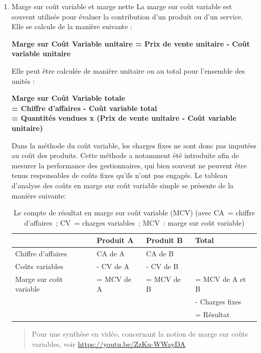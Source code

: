 \documentclass{tufte-handout}
\begin{document}
\begin{enumerate}
\item Marge sur coût variable et marge nette
\label{sec:org3563c23}
La marge sur coût variable est souvent utilisée pour évaluer la contribution d'un produit ou d'un service. Elle se calcule de la manière suivante :\\
\begin{center}
\textbf{Marge sur Coût Variable unitaire = Prix de vente unitaire - Coût variable unitaire}\\
\end{center}
Elle peut être calculée de manière unitaire ou au total pour l'ensemble des unités :\\
\begin{center}
\textbf{Marge sur Coût Variable totale}\\
\textbf{= Chiffre d'affaires - Coût variable total}\\
\textbf{= Quantités vendues x (Prix de vente unitaire - Coût variable unitaire)}\\
\end{center}
Dans la méthode du coût variable, les charges fixes ne sont donc pas imputées au coût des produits. Cette méthode a notamment été introduite afin de mesurer la performance des gestionnaires, qui bien souvent ne peuvent être tenus responsables de coûts fixes qu'ils n'ont pas engagés. Le tableau d'analyse des coûts en marge sur coût variable simple se présente de la manière suivante:\\
\begin{table}[htbp]
\caption{Le compte de résultat en marge sur coût variable (MCV) (avec CA = chiffre d'affaires ; CV = charges variables ; MCV : marge sur coût variable)}
\centering
\begin{tabular}{llll}
 & Produit A & Produit B & Total\\
\hline
Chiffre d'affaires & CA de A & CA de B & \\
Coûts variables & - CV de A & - CV de B & \\
Marge sur coût variable & = MCV de A & = MCV de B & = MCV de A et B\\
 &  &  & - Charges fixes\\
 &  &  & = Résultat\\
\end{tabular}
\end{table}

\begin{quote}
Pour une synthèse en vidéo, concernant la notion de marge sur coûts variables, voir \url{https://youtu.be/ZzKu-WWayDA}\\
\end{quote}


\end{enumerate}
\end{document}
